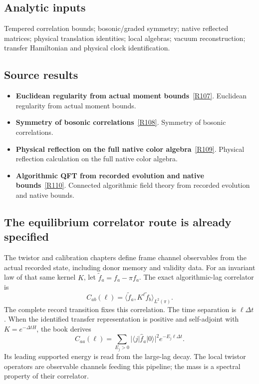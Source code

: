 \documentclass[11pt,a4paper]{article}
\begin{document}
\subsection*{Analytic inputs}
Tempered correlation bounds; bosonic/graded symmetry; native reflected matrices; physical translation identities; local algebras; vacuum reconstruction; transfer Hamiltonian and physical clock identification.
\subsection*{Source results}
\begin{itemize}
\item \textbf{Euclidean regularity from actual moment bounds}~\hyperref[src:thm-os-os0-fg]{[R107]}. Euclidean regularity from actual moment bounds.
\item \textbf{Symmetry of bosonic correlations}~\hyperref[src:thm-os-os4-fg]{[R108]}. Symmetry of bosonic correlations.
\item \textbf{Physical reflection on the full native color algebra}~\hyperref[src:prop-ym-native-color-reflected-matrices]{[R109]}. Physical reflection calculation on the full native color algebra.
\item \textbf{Algorithmic QFT from recorded evolution and native bounds}~\hyperref[src:thm-ym-algorithmic-qft-synthesis]{[R110]}. Connected algorithmic field theory from recorded evolution and native bounds.
\end{itemize}
\subsection*{The equilibrium correlator route is already specified}
The twistor and calibration chapters define frame channel observables from the actual recorded state, including donor memory and validity data. For an invariant law of that same kernel \(K\), let \(\widetilde f_a=f_a-\pi f_a\). The exact algorithmic-lag correlator is
\[
C_{ab}(\ell)=\langle\widetilde f_a,K^\ell\widetilde f_b\rangle_{L^2(\pi)}.
\]
The complete record transition fixes this correlation. The time separation is \(\ell\Delta t\). When the identified transfer representation is positive and self-adjoint with \(K=e^{-\Delta tH}\), the book derives
\[
C_{aa}(\ell)=\sum_{E_j>0}
|\langle j|\widehat f_a|0\rangle|^2e^{-E_j\ell\Delta t}.
\]
Its leading supported energy is read from the large-lag decay. The local twistor operators are observable channels feeding this pipeline; the mass is a spectral property of their correlator.
\end{document}

